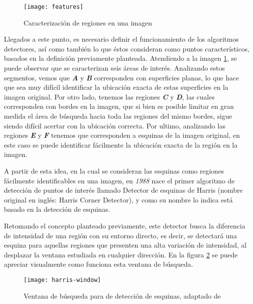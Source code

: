 \begin{figure}[H]
	\centering
	\texttt{[image: features]}
	\caption[Caracterización de regiones en una imagen]{Caracterización de regiones en una imagen\protect\footnotemark}
	\label{imagen:features}
\end{figure}

Llegados a este punto, es necesario definir el funcionamiento de los algoritmos detectores, así como también lo que éstos consideran como puntos característicos, basados en la definición previamente planteada. Atendiendo a la imagen \ref{imagen:features}, se puede observar que se caracterizan seis áreas de interés. Analizando estos segmentos, vemos que \textbf{\textit{A}} y \textbf{\textit{B}} corresponden con superficies planas, lo que hace que sea muy difícil identificar la ubicación exacta de estas superficies en la imagen original. Por otro lado, tenemos las regiones \textbf{\textit{C}} y \textbf{\textit{D}}, las cuales corresponden con bordes en la imagen, que si bien es posible limitar en gran medida el área de búsqueda hacia toda las regiones del mismo bordes, sigue siendo difícil acertar con la ubicación correcta. Por ultimo, analizando las regiones \textbf{\textit{E}} y \textbf{\textit{F}} tenemos que corresponden a esquinas de la imagen original, en este caso se puede identificar fácilmente la ubicación exacta de la región en la imagen.

A partir de esta idea, en la cual se consideran las esquinas como regiones fácilmente identificables en una imagen, en \textit{1988} nace el primer algoritmo de detección de puntos de interés llamado Detector de esquinas de Harris \cite{harris} (nombre original en inglés: Harris Corner Detector), y como su nombre lo indica está basado en la detección de esquinas.

Retomando el concepto planteado previamente, este detector busca la diferencia de intensidad de una región con su entorno directo, es decir, se detectará una esquina para aquellas regiones que presenten una alta variación de intensidad, al desplazar la ventana estudiada en cualquier dirección. En la figura \ref{imagen:harris-window} se puede apreciar visualmente como funciona esta ventana de búsqueda.

\begin{figure}[H]
	\centering
	\texttt{[image: harris-window]}
	\caption[Ventana de búsqueda para de detección de esquinas]{Ventana de búsqueda para de detección de esquinas, adaptado de\protect\footnotemark}
	\label{imagen:harris-window}
\end{figure}

